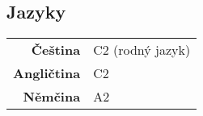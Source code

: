 \documentclass{modernsimplecv}
\newlength{\leftcolwidth}
\begin{document}
\begin{paracol}{2}
{\begin{minipage}[t]{\leftcolwidth}
\end{minipage}\hfill
\vspace{1em}

\begin{minipage}[t]{\leftcolwidth}
    \section*{\large{Jazyky}}
    \begin{tabular}{>{\footnotesize\bfseries}r >{\footnotesize}p{}}
        Čeština & C2 (rodný jazyk)\\
        Angličtina & C2 \\
        Němčina & A2 \\
    \end{tabular}
    \bigskip
\end{minipage}

\begin{minipage}[t]{0.885\leftcolwidth}
    \vspace{-10pt}

\end{minipage}}
\end{paracol}
\end{document}
